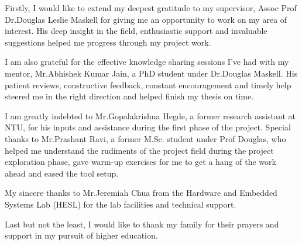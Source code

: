\quad Firstly, I would like to extend my deepest gratitude to my supervisor, Assoc Prof Dr.Douglas Leslie Maskell for giving me an opportunity to work on my area of interest. His deep insight in the field, enthusiastic support and invaluable suggestions helped me progress through my project work. \newline

I am also grateful for the effective knowledge sharing sessions I’ve had with my mentor, Mr.Abhishek Kumar Jain, a PhD student under Dr.Douglas Maskell. His patient reviews, constructive feedback, constant encouragement and timely help steered me in the right direction and helped finish my thesis on time.\newline 

I am greatly indebted to Mr.Gopalakrishna Hegde, a former research assistant at NTU, for his inputs and assistance during the first phase of the project. Special thanks to Mr.Prashant Ravi, a former M.Sc. student under Prof Douglas, who helped me understand the rudiments of the project field during the project exploration phase, gave warm-up exercises for me to get a hang of the work ahead and eased the tool setup.\newline 

My sincere thanks to Mr.Jeremiah Chua from the Hardware and Embedded Systems Lab (HESL) for the lab facilities and technical support.\newline 

Last but not the least, I would like to thank my family for their prayers and support in my pursuit of higher education. 

